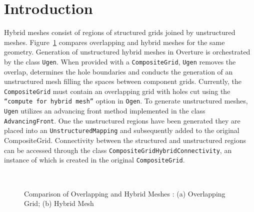 \documentclass{article}
\begin{document}
\section{Introduction}
Hybrid meshes consist of regions of structured grids joined by unstructured 
meshes.  Figure~\ref{fig:overlapHybridComp} compares overlapping and hybrid meshes
for the same geometry.  Generation of unstructured hybrid meshes in Overture is orchestrated by the 
class {\tt Ugen}.  When provided with a {\tt CompositeGrid},
{\tt Ugen} removes the overlap, determines the hole boundaries and conducts the
generation of an unstructured mesh filling the spaces between component grids. 
Currently, the {\tt CompositeGrid} must contain an overlapping grid with holes 
cut using the {\tt ``compute for hybrid mesh''} option in {\tt Ogen}.  To generate
unstructured meshes, {\tt Ugen} utilizes an advancing front method implemented
in the class {\tt AdvancingFront}.  One the unstructured regions have been generated they
are placed into an {\tt UnstructuredMapping} and subsequently added to the 
original CompositeGrid.  Connectivity between the structured and unstructured regions 
can be accessed through the class {\tt CompositeGridHybridConnectivity}, an instance of
which is created in the original {\tt CompositeGrid}.

\begin{figure} [htb] 
\centering
 \mbox{
       \hspace{.25in}
       }
 \caption{Comparison of Overlapping and Hybrid Meshes : (a) Overlapping Grid; (b) Hybrid Mesh} \label{fig:overlapHybridComp} 
\end{figure}
\end{document}
